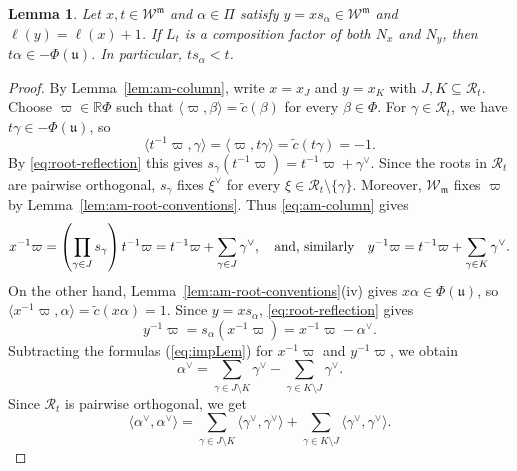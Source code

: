 \documentclass[12pt]{amsart}
\newtheorem{lemma}[theorem]{Lemma}
\theoremstyle{definition}
\numberwithin{equation}{section}
\newcommand{\m}{\mathfrak m}
\newcommand{\W}{\mathscr W}
\begin{document}
\begin{lemma}\label{lem:am-common-descent}
Let $x,t\in\W^{\m}$ and $\alpha\in\Pi$ satisfy
$y=xs_\alpha\in\W^{\m}$ and $\ell(y)=\ell(x)+1$.
If $L_t$ is a composition factor of both $N_x$ and $N_y$, then $t\alpha\in-\Phi(\mathfrak{u})$.
In particular, $ts_\alpha<t$.
\end{lemma}

\begin{proof}
By Lemma~\ref{lem:am-column}, write $x=x_J$ and $y=x_K$
with $J,K\subseteq\mathscr R_t$.
Choose $\varpi\in\mathbb R\Phi$ such that
$\langle\varpi,\beta\rangle=\tilde c(\beta)$ for every
$\beta\in\Phi$. For $\gamma\in\mathscr R_t$, we have $t\gamma\in-\Phi(\mathfrak{u})$, so
\begin{equation}
 \langle t^{-1}\varpi,\gamma\rangle
 =\langle\varpi,t\gamma\rangle
 =\tilde c(t\gamma)=-1.
\end{equation}
By \eqref{eq:root-reflection} this gives
$s_\gamma(t^{-1}\varpi)=t^{-1}\varpi+\gamma^\vee$.
Since the roots in $\mathscr R_t$ are pairwise orthogonal,
$s_\gamma$ fixes $\xi^\vee$ for every
$\xi\in\mathscr R_t\setminus\{\gamma\}$.
Moreover, $\W_{\m}$ fixes $\varpi$ by
Lemma~\ref{lem:am-root-conventions}.
Thus \eqref{eq:am-column} gives
\begin{equation}\label{eq:impLem}
 x^{-1}\varpi
 =\left(\prod_{\gamma\in J}s_\gamma\right)t^{-1}\varpi
 =t^{-1}\varpi+\sum_{\gamma\in J}\gamma^\vee,\quad \textnormal{and, similarly}\quad
 y^{-1}\varpi
 =t^{-1}\varpi+\sum_{\gamma\in K}\gamma^\vee.
\end{equation}
On the other hand, Lemma~\ref{lem:am-root-conventions}\textup{(iv)}
gives $x\alpha\in\Phi(\mathfrak{u})$, so
$\langle x^{-1}\varpi,\alpha\rangle=\tilde c(x\alpha)=1$.
Since $y=xs_\alpha$, \eqref{eq:root-reflection} gives
\[
 y^{-1}\varpi=s_\alpha(x^{-1}\varpi)
 =x^{-1}\varpi-\alpha^\vee.
\]
Subtracting the formulas (\ref{eq:impLem}) for $x^{-1}\varpi$ and
$y^{-1}\varpi$, we obtain
\begin{equation}\label{eq:alphaVee}
 \alpha^\vee
 =\sum_{\gamma\in J\setminus K}\gamma^\vee
  -\sum_{\gamma\in K\setminus J}\gamma^\vee.
\end{equation}
Since $\mathscr{R}_t$ is pairwise orthogonal, we get
\begin{equation}\label{eq:am-coroot-squares}
 \langle\alpha^\vee,\alpha^\vee\rangle=\sum_{\gamma\in J\setminus K}
       \langle\gamma^\vee,\gamma^\vee\rangle+\sum_{\gamma\in K\setminus J}
       \langle\gamma^\vee,\gamma^\vee\rangle.
\end{equation}

\end{proof}
\end{document}
